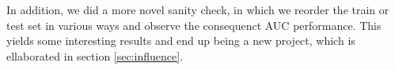 In addition, we did a more novel sanity check, in which we reorder the train or test set in various ways and observe the consequenct AUC performance. This yields some interesting results and end up being a new project, which is ellaborated in section \ref{sec:influence}.
















